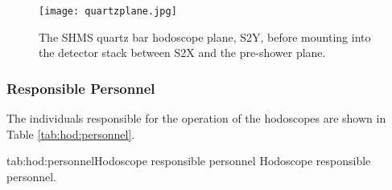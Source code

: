 {\begin{figure}
\begin{center}
  \texttt{[image: quartzplane.jpg]}
  \caption{\label{fig:quartzplane}The SHMS quartz bar hodoscope plane, S2Y,
before mounting into the detector stack between S2X and the pre-shower
plane.}
\end{center}
\end{figure}

\subsubsection{Responsible Personnel}

The individuals responsible for the operation
of the hodoscopes are shown in Table \ref{tab:hod:personnel}.

\begin{namestab}{tab:hod:personnel}{Hodoscope responsible personnel}{%
      Hodoscope responsible personnel.}
  \DaveMack{}
\end{namestab}


}%
